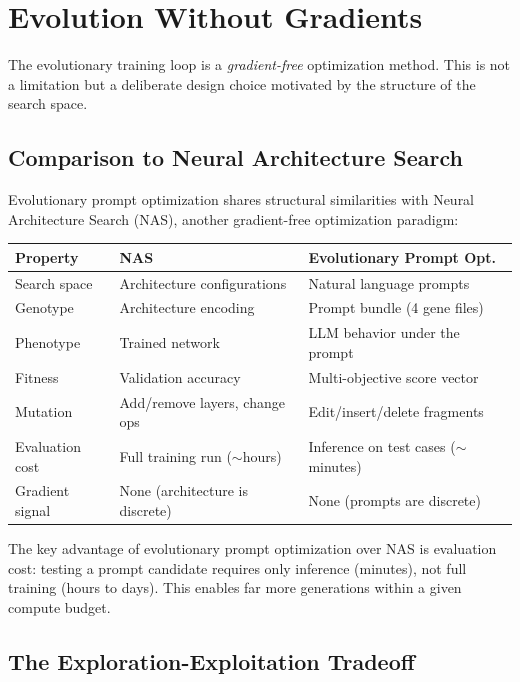 \section{Evolution Without Gradients}
\label{sec:gradient-free}

The evolutionary training loop is a \emph{gradient-free} optimization method. This is not a limitation but a deliberate design choice motivated by the structure of the search space.

\subsection{Comparison to Neural Architecture Search}

Evolutionary prompt optimization shares structural similarities with Neural Architecture Search (NAS), another gradient-free optimization paradigm:

\begin{center}
\renewcommand{\arraystretch}{1.15}
\begin{tabularx}{0.92\textwidth}{L{3cm} L{4cm} Y}
\toprule
\textbf{Property} & \textbf{NAS} & \textbf{Evolutionary Prompt Opt.} \\
\midrule
Search space & Architecture configurations & Natural language prompts \\
Genotype & Architecture encoding & Prompt bundle (4 gene files) \\
Phenotype & Trained network & LLM behavior under the prompt \\
Fitness & Validation accuracy & Multi-objective score vector \\
Mutation & Add/remove layers, change ops & Edit/insert/delete fragments \\
Evaluation cost & Full training run ($\sim$hours) & Inference on test cases ($\sim$minutes) \\
Gradient signal & None (architecture is discrete) & None (prompts are discrete) \\
\bottomrule
\end{tabularx}
\end{center}

The key advantage of evolutionary prompt optimization over NAS is evaluation cost: testing a prompt candidate requires only inference (minutes), not full training (hours to days). This enables far more generations within a given compute budget.

\subsection{The Exploration-Exploitation Tradeoff}

